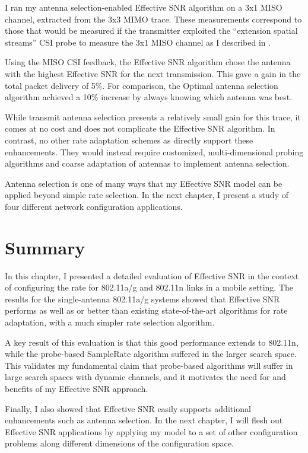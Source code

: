 I ran my antenna selection-enabled Effective SNR algorithm on a 3x1 MISO channel, extracted from the 3x3 MIMO trace. These measurements correspond to those that would be measured if the transmitter exploited the ``extension spatial streams'' CSI probe to measure the 3x1 MISO channel as I described in .

Using the MISO CSI feedback, the Effective SNR algorithm chose the antenna with the highest Effective SNR for the next transmission. This gave a gain in the total packet delivery of 5\%. For comparison, the Optimal antenna selection algorithm achieved a 10\% increase by always knowing which antenna was best.

While transmit antenna selection presents a relatively small gain for this trace, it comes at no cost and does not complicate the Effective SNR algorithm. In contrast, no other rate adaptation schemes as directly support these enhancements. They would instead require customized, multi-dimensional probing algorithms and coarse adaptation of antennas to implement antenna selection.

Antenna selection is one of many ways that my Effective SNR model can be applied beyond simple rate selection. In the next chapter, I present a study of four different network configuration applications.

\section{Summary}
In this chapter, I presented a detailed evaluation of Effective SNR in the context of configuring the rate for 802.11a/g and 802.11n links in a mobile setting. The results for the single-antenna 802.11a/g systems showed that Effective SNR performs as well as or better than existing state-of-the-art algorithms for rate adaptation, with a much simpler rate selection algorithm.

A key result of this evaluation is that this good performance extends to 802.11n, while the probe-based SampleRate algorithm suffered in the larger search space. This validates my fundamental claim that probe-based algorithms will suffer in large search spaces with dynamic channels, and it motivates the need for and benefits of my Effective SNR approach.

Finally, I also showed that Effective SNR easily supports additional enhancements such as antenna selection. In the next chapter, I will flesh out Effective SNR applications by applying my model to a set of other configuration problems along different dimensions of the configuration space.

\ifx\mainfile\undefined

\fi
